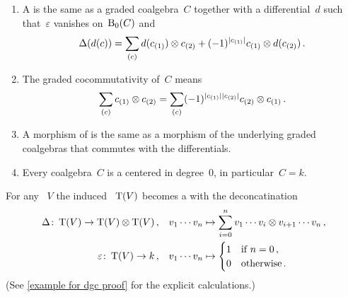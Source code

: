 \documentclass[a4paper,10pt,headings=standardclasses]{scrartcl}
\begin{document}

\begin{remark}
  \leavevmode
  \begin{enumerate}
    \item
      A {\dgc} is the same as a graded coalgebra~$C$ together with a differential~$d$ such that~$\varepsilon$ vanishes on~$\operatorname{B}_0(C)$ and
      \[
        \Delta(d(c))
        =
        \sum_{(c)}
        d(c_{(1)}) \otimes c_{(2)}
        + (-1)^{\lvert c_{(1)}\rvert} c_{(1)} \otimes d(c_{(2)}) \,.
      \]
    \item
      The graded cocommutativity of~$C$ means
      \[
        \sum_{(c)} c_{(1)} \otimes c_{(2)}
        =
        \sum_{(c)} (-1)^{\lvert c_{(1)}\rvert \lvert c_{(2)}\rvert} c_{(2)} \otimes c_{(1)} \,.
      \]
    \item
      A morphism of {\dgcs} is the same as a morphism of the underlying graded coalgebras that commutes with the differentials.
    \item
      Every coalgebra~$C$ is a {\dgc} centered in degree~$0$, in particular~$C = k$.
  \end{enumerate}
\end{remark}

\begin{example}
  \label{example for dgc}
  For any {\dgv}~$V$ the induced {\dgv}~$\operatorname{T}(V)$ becomes a {\dgc} with the deconcatination
  \begin{align*}
    \Delta
    \colon
    \operatorname{T}(V)
    \to
    \operatorname{T}(V) \otimes \operatorname{T}(V) \,,
    \quad
    &v_1 \dotsm v_n
    \mapsto
    \sum_{i=0}^n
    v_1 \dotsm v_i \otimes v_{i+1} \dotsm v_n \,,
  \\
    \varepsilon
    \colon
    \operatorname{T}(V)
    \to
    k \,,
    \quad
    &v_1 \dotsm v_n
    \mapsto
    \begin{cases}
      1 & \text{if~$n = 0$} \,, \\
      0 & \text{otherwise} \,.
    \end{cases}
  \end{align*}
  (See \cref{example for dgc proof} for the explicit calculations.)
\end{example}
\end{document}
